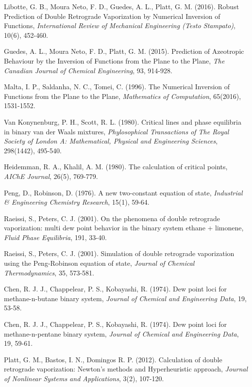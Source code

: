\documentclass{article}
\theoremstyle{definition}
\theoremstyle{remark}
\begin{document}
\begin{thebibliography}{99}

 Libotte, G. B., Moura Neto, F. D., Guedes, A. L., Platt, G. M. (2016). Robust Prediction of Double Retrograde Vaporization
by Numerical Inversion of Functions, \emph{International Review of Mechanical Engineering (Testo Stampato)}, 10(6), 452-460.

 Guedes, A. L., Moura Neto, F. D., Platt, G. M. (2015). Prediction of Azeotropic Behaviour by the Inversion of Functions from the Plane to the Plane, \emph{The Canadian Journal of Chemical Engineering}, 93, 914-928.

 Malta, I. P., Saldanha, N. C., Tomei, C. (1996). The Numerical Inversion of Functions from the Plane to the Plane, \emph{Mathematics of Computation}, 65(2016), 1531-1552.

 Van Konynenburg, P. H., Scott, R. L. (1980). Critical lines and phase equilibria in binary van der Waals mixtures, \emph{Phylosophical Transactions of The Royal Society of London A: Mathematical, Physical and Engineering Sciences}, 298(1442), 495-540.

 Heidemman, R. A., Khalil, A. M. (1980). The calculation of critical points, \emph{AIChE Journal}, 26(5), 769-779.

 Peng, D., Robinson, D. (1976). A new two-constant equation of state, \emph{Industrial \& Engineering Chemistry Research}, 15(1), 59-64.

 Raeissi, S., Peters, C. J. (2001). On the phenomena of double retrograde vaporization: multi dew point behavior in the binary system ethane + limonene, \emph{Fluid Phase Equilibria}, 191, 33-40.

 Raeissi, S., Peters, C. J. (2001). Simulation of double retrograde
vaporization using the Peng-Robinson equation of state, \emph{Journal of Chemical Thermodynamics}, 35, 573-581.

 Chen, R. J. J., Chappelear, P. S., Kobayashi, R. (1974). Dew point loci for methane-n-butane binary system, \emph{Journal of Chemical and Engineering Data}, 19, 53-58.

 Chen, R. J. J., Chappelear, P. S., Kobayashi, R. (1974). Dew point loci for methane-n-pentane binary system, \emph{Journal of Chemical and Engineering Data}, 19, 59-61.

 Platt, G. M., Bastos, I. N., Domingos R. P. (2012). Calculation of double retrograde vaporization: Newton's methods and Hyperheuristic approach, \emph{Journal of Nonlinear Systems and Applications}, 3(2), 107-120.

\end{thebibliography}
\end{document}
